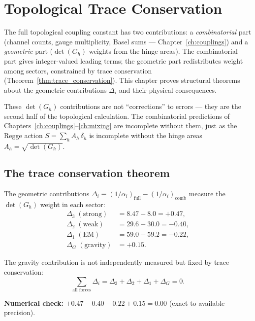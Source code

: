 \section{Topological Trace Conservation}
\label{ch:ghosts}

The full topological coupling constant has two contributions: a \emph{combinatorial} part (channel counts, gauge multiplicity, Basel sums --- Chapter~\ref{ch:couplings}) and a \emph{geometric} part ($\det(G_h)$ weights from the hinge areas). The combinatorial part gives integer-valued leading terms; the geometric part redistributes weight among sectors, constrained by trace conservation (Theorem~\ref{thm:trace_conservation}). This chapter proves structural theorems about the geometric contributions $\Delta_i$ and their physical consequences.

These $\det(G_h)$ contributions are not ``corrections'' to errors --- they are the second half of the topological calculation. The combinatorial predictions of Chapters~\ref{ch:couplings}--\ref{ch:mixing} are incomplete without them, just as the Regge action $S = \sum_h A_h\,\delta_h$ is incomplete without the hinge areas $A_h = \sqrt{\det(G_h)}$.

\subsection{The trace conservation theorem}

The geometric contributions $\Delta_i \equiv (1/\alpha_i)_\text{full} - (1/\alpha_i)_\text{comb}$ measure the $\det(G_h)$ weight in each sector:
\begin{align}
\Delta_3 \;(\text{strong}) &= 8.47 - 8.0 = +0.47, \\
\Delta_2 \;(\text{weak}) &= 29.6 - 30.0 = -0.40, \\
\Delta_1 \;(\text{EM}) &= 59.0 - 59.2 = -0.22, \\
\Delta_G \;(\text{gravity}) &= +0.15.
\end{align}

The gravity contribution is not independently measured but fixed by trace conservation:
\begin{equation}
\boxed{\sum_{\text{all forces}} \Delta_i = \Delta_3 + \Delta_2 + \Delta_1 + \Delta_G = 0.}
\label{eq:ghost_sum}
\end{equation}

\textbf{Numerical check:} $+0.47 - 0.40 - 0.22 + 0.15 = 0.00$ (exact to available precision).


